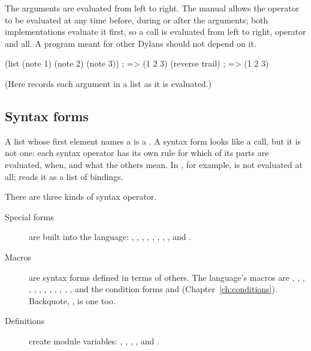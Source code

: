 \noindent The arguments are evaluated from left to right. The manual allows
the operator to be evaluated at any time before, during or after the
arguments; both implementations evaluate it first, so a call is evaluated
from left to right, operator and all. A program meant for other Dylans
should not depend on it.

\begin{dylan}
(list (note 1) (note 2) (note 3))   ; => (1 2 3)
(reverse trail)                     ; => (1 2 3)
\end{dylan}

\noindent (Here  records each argument in a list as it is
evaluated.)

\subsection{Syntax forms}\label{sec:syntax-forms}

A list whose first element names a  is a
. A syntax form looks like a call, but it is not one:
each syntax operator has its own rule for which of its parts are evaluated,
when, and what the others mean. In , for
example,  is not evaluated at all;  reads it as a
list of bindings.

There are three kinds of syntax operator.

\begin{description}
\item[Special forms] are built into the language:
  , , , ,
  , , , ,  and
  .
\item[Macros] are syntax forms defined in terms of others. The language's
  macros are , , , , , , , ,
  , , , , and the
  condition forms  and 
  (Chapter~\ref{ch:conditions}). Backquote, , is one too.
\item[Definitions] create module variables: ,
  , , ,
   and .
\end{description}

